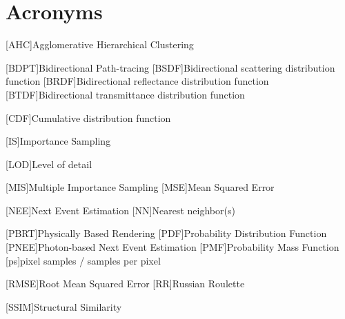 \newpage
\section*{Acronyms}

\begin{acronym}[ECU]


[AHC]{Agglomerative Hierarchical Clustering}

[BDPT]{Bidirectional Path-tracing}
[BSDF]{Bidirectional scattering distribution function}
[BRDF]{Bidirectional reflectance distribution function}
[BTDF]{Bidirectional transmittance distribution function}

[CDF]{Cumulative distribution function}

[IS]{Importance Sampling}

[LOD]{Level of detail}

[MIS]{Multiple Importance Sampling}
[MSE]{Mean Squared Error}

[NEE]{Next Event Estimation}
[NN]{Nearest neighbor(s)}

[PBRT]{Physically Based Rendering}
[PDF]{Probability Distribution Function}
[PNEE]{Photon-based Next Event Estimation}
[PMF]{Probability Mass Function}
[ps]{pixel samples / samples per pixel}

[RMSE]{Root Mean Squared Error}
[RR]{Russian Roulette}

[SSIM]{Structural Similarity}

\end{acronym}
